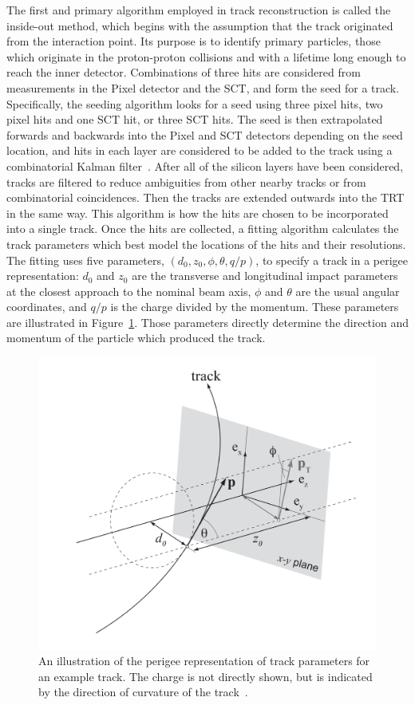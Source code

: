 The first and primary algorithm employed in track reconstruction is called the inside-out method, which begins with the assumption that the track originated from the interaction point.
Its purpose is to identify primary particles, those which originate in the proton-proton collisions and with a lifetime long enough to reach the inner detector.
Combinations of three hits are considered from measurements in the Pixel detector and the \ac{SCT}, and form the seed for a track. 
Specifically, the seeding algorithm looks for a seed using three pixel hits, two pixel hits and one \ac{SCT} hit, or three \ac{SCT} hits.
The seed is then extrapolated forwards and backwards into the Pixel and \ac{SCT} detectors depending on the seed location, and hits in each layer are considered to be added to the track using a combinatorial Kalman filter~\cite{tracking_performance}.
After all of the silicon layers have been considered, tracks are filtered to reduce ambiguities from other nearby tracks or from combinatorial coincidences.
Then the tracks are extended outwards into the \ac{TRT} in the same way.
This algorithm is how the hits are chosen to be incorporated into a single track.
Once the hits are collected, a fitting algorithm calculates the track parameters which best model the locations of the hits and their resolutions.
The fitting uses five parameters, $(d_0, z_0, \phi, \theta, q/p)$, to specify a track in a perigee representation: $d_0$ and $z_0$ are the transverse and longitudinal impact parameters at the closest approach to the nominal beam axis, $\phi$ and $\theta$ are the usual angular coordinates, and $q/p$ is the charge divided by the momentum.
These parameters are illustrated in Figure~\ref{fig:perigee_rep}.
Those parameters directly determine the direction and momentum of the particle which produced the track.

\begin{figure}
\includegraphics[width=\fullfig]{figures/perigee_rep.png}
\caption{An illustration of the perigee representation of track parameters for an example track. The charge is not directly shown, but is indicated by the direction of curvature of the track~\cite{atlas_extrapolation}.}
\label{fig:perigee_rep}
\end{figure}

